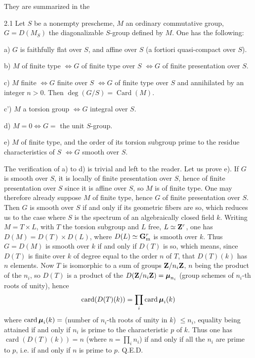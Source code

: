 They are summarized in the
\begin{proposition}{2.1}\label{VIII.2.1}
Let $S$ be a nonempty prescheme, $M$ an ordinary commutative group, $G=D(M_S)$ the diagonalizable $S$-group defined by $M$. One has the following:

a) $G$ is faithfully flat over $S$, and affine over $S$ (a fortiori quasi-compact over $S$).

b) $M$ of finite type $\Longleftrightarrow G$ of finite type over $S$ $\Longleftrightarrow G$ of finite presentation over $S$.

c) $M$ finite $\Longleftrightarrow G$ finite over $S$ $\Longleftrightarrow G$ of finite type over $S$ and annihilated by an integer $n>0$. Then $\deg(G/S)=\operatorname{Card}(M)$.

c') $M$ a torsion group $\Longleftrightarrow G$ integral over $S$.

d) $M=0\Longleftrightarrow G=$ the unit $S$-group.

e) $M$ of finite type, and the order of its torsion subgroup prime to the residue characteristics of $S$ $\Longleftrightarrow G$ smooth over $S$.
\end{proposition}
The verification of a) to d) is trivial and left to the reader. Let us prove e). If $G$ is smooth over $S$, it is locally of finite presentation over $S$, hence of finite presentation over $S$ since it is affine over $S$, so $M$ is of finite type. One may therefore already suppose $M$ of finite type, hence $G$ of finite presentation over $S$. Then $G$ is smooth over $S$ if and only if its geometric fibers are so, which reduces us to the case where $S$ is the spectrum of an algebraically closed field $k$. Writing $M=T\times L$, with $T$ the torsion subgroup and $L$ free, $L\simeq\mathbf{Z}^r$, one has $D(M)=D(T)\times D(L)$, where $D(L)\simeq\mathbf{G}_{\mathrm{m}}^r$ is smooth over $k$. Thus $G=D(M)$ is smooth over $k$ if and only if $D(T)$ is so, which means, since $D(T)$ is finite over $k$ of degree equal to the order $n$ of $T$, that $D(T)(k)$ has $n$ elements. Now $T$ is isomorphic to a sum of groups $\mathbf{Z}/n_i\mathbf{Z}$, $n$ being the product of the $n_i$, so $D(T)$ is a product of the $D(\mathbf{Z}/n_i\mathbf{Z})=\boldsymbol{\mu}_{n_i}$ (group schemes of $n_i$-th roots of unity), hence
\[
\operatorname{card}(D(T)(k))=\prod_i\operatorname{card}\boldsymbol{\mu}_i(k)
\]
where $\operatorname{card}\boldsymbol{\mu}_i(k)=$ (number of $n_i$-th roots of unity in $k$) $\leq n_i$, equality being attained if and only if $n_i$ is prime to the characteristic $p$ of $k$. Thus one has $\operatorname{card}(D(T)(k))=n$ (where $n=\prod_i n_i$) if and only if all the $n_i$ are prime to $p$, i.e. if and only if $n$ is prime to $p$. \hfill Q.E.D.

